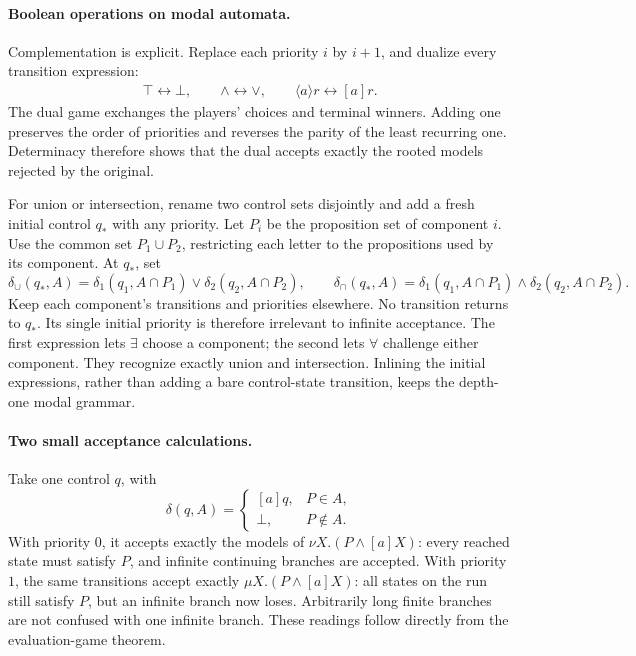\paragraph{Boolean operations on modal automata.}
Complementation is explicit. Replace
each priority \(i\) by \(i+1\), and
dualize every transition expression:
\[
\begin{gathered}
 \top\leftrightarrow\bot,\qquad
 \land\leftrightarrow\lor,\qquad
 \langle a\rangle r\leftrightarrow[a]r.
\end{gathered}
\]
The dual game exchanges the players'
choices and terminal winners.
Adding one preserves the order of
priorities and reverses the parity
of the least recurring one.
Determinacy therefore shows that the
dual accepts exactly the rooted
models rejected by the original.

For union or intersection, rename two
control sets disjointly and add a fresh
initial control \(q_*\) with any priority.
Let \(P_i\) be the proposition set of
component \(i\). Use the common set
\(P_1\cup P_2\), restricting each letter to the
propositions used by its component.
At \(q_*\), set
\[
 \delta_\cup(q_*,A)
       =\delta_1(q_1,A\cap P_1)\lor
                         \delta_2(q_2,A\cap P_2),
 \qquad
 \delta_\cap(q_*,A)
       =\delta_1(q_1,A\cap P_1)\land
                         \delta_2(q_2,A\cap P_2).
\]
Keep each component's transitions and
priorities elsewhere. No transition
returns to \(q_*\). Its single initial
priority is therefore irrelevant to
infinite acceptance.
The first expression lets \(\exists\)
choose a component; the second lets
\(\forall\) challenge either component.
They recognize exactly union and
intersection. Inlining the initial
expressions, rather than adding a
bare control-state transition, keeps
the depth-one modal grammar.

\paragraph{Two small acceptance calculations.}
Take one control \(q\), with
\[
 \delta(q,A)=
 \begin{cases}
   [a]q,&P\in A,\\
   \bot,&P\notin A.
 \end{cases}
\]
With priority \(0\), it accepts exactly
the models of \(\nu X.(P\land[a]X)\):
every reached state must satisfy \(P\),
and infinite continuing branches are
accepted. With priority \(1\), the
same transitions accept exactly
\(\mu X.(P\land[a]X)\): all states on
the run still satisfy \(P\), but an
infinite branch now loses. Arbitrarily
long finite branches are not confused
with one infinite branch.
These readings follow directly from
the evaluation-game theorem.

